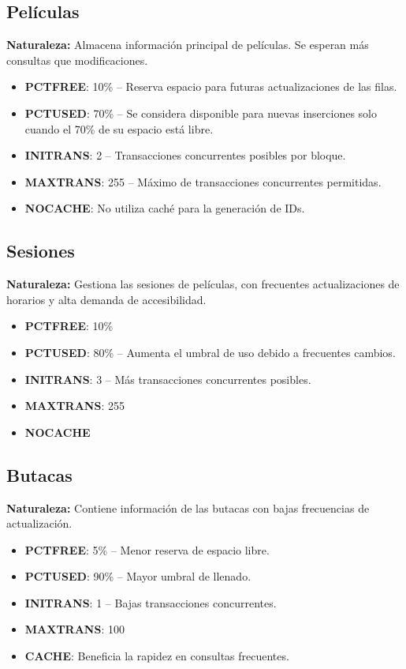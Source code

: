 \subsection{Películas}
\textbf{Naturaleza:} Almacena información principal de películas. Se esperan más consultas que modificaciones.
\begin{itemize}
    \item \textbf{PCTFREE}: 10\% -- Reserva espacio para futuras actualizaciones de las filas.
    \item \textbf{PCTUSED}: 70\% -- Se considera disponible para nuevas inserciones solo cuando el 70\% de su espacio está libre.
    \item \textbf{INITRANS}: 2 -- Transacciones concurrentes posibles por bloque.
    \item \textbf{MAXTRANS}: 255 -- Máximo de transacciones concurrentes permitidas.
    \item \textbf{NOCACHE}: No utiliza caché para la generación de IDs.
\end{itemize}

\subsection{Sesiones}
\textbf{Naturaleza:} Gestiona las sesiones de películas, con frecuentes actualizaciones de horarios y alta demanda de accesibilidad.
\begin{itemize}
    \item \textbf{PCTFREE}: 10\%
    \item \textbf{PCTUSED}: 80\% -- Aumenta el umbral de uso debido a frecuentes cambios.
    \item \textbf{INITRANS}: 3 -- Más transacciones concurrentes posibles.
    \item \textbf{MAXTRANS}: 255
    \item \textbf{NOCACHE}
\end{itemize}

\subsection{Butacas}
\textbf{Naturaleza:} Contiene información de las butacas con bajas frecuencias de actualización.
\begin{itemize}
    \item \textbf{PCTFREE}: 5\% -- Menor reserva de espacio libre.
    \item \textbf{PCTUSED}: 90\% -- Mayor umbral de llenado.
    \item \textbf{INITRANS}: 1 -- Bajas transacciones concurrentes.
    \item \textbf{MAXTRANS}: 100
    \item \textbf{CACHE}: Beneficia la rapidez en consultas frecuentes.
\end{itemize}


